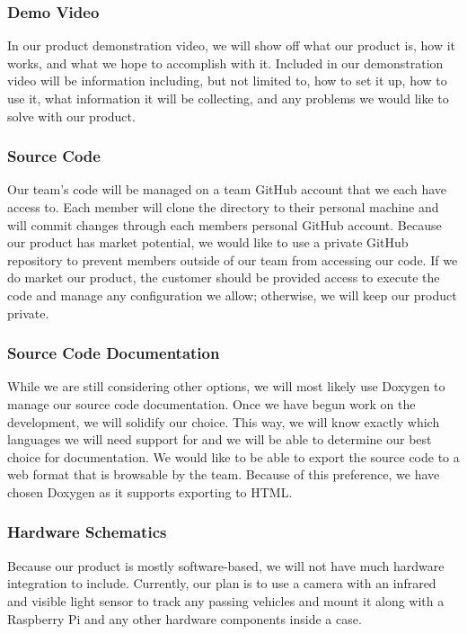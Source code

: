 \subsubsection{Demo Video}
In our product demonstration video, we will show off what our product is, how it works, and what we hope to accomplish with it. Included in our demonstration video will be information including, but not limited to, how to set it up, how to use it, what information it will be collecting, and any problems we would like to solve with our product.

\subsubsection{Source Code}
Our team’s code will be managed on a team GitHub account that we each have access to. Each member will clone the directory to their personal machine and will commit changes through each members personal GitHub account. Because our product has market potential, we would like to use a private GitHub repository to prevent members outside of our team from accessing our code.
If we do market our product, the customer should be provided access to execute the code and manage any configuration we allow; otherwise, we will keep our product private.

\subsubsection{Source Code Documentation}
While we are still considering other options, we will most likely use Doxygen to manage our source code documentation. Once we have begun work on the development, we will solidify our choice. This way, we will know exactly which languages we will need support for and we will be able to determine our best choice for documentation. We would like to be able to export the source code to a web format that is browsable by the team. Because of this preference, we have chosen Doxygen as it supports exporting to HTML.

\subsubsection{Hardware Schematics}
Because our product is mostly software-based, we will not have much hardware integration to include. Currently, our plan is to use a camera with an infrared and visible light sensor to track any passing vehicles and mount it along with a Raspberry Pi and any other hardware components inside a case. 

